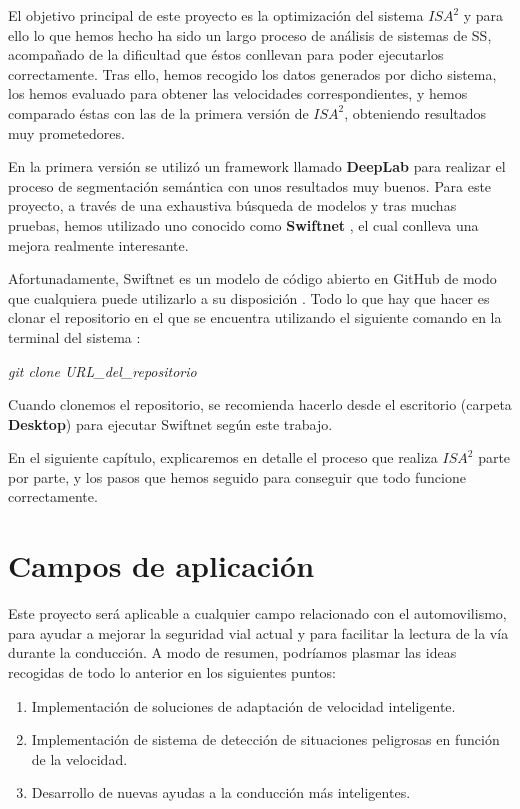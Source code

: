 El objetivo principal de este proyecto es la optimización del sistema $ISA^{2}$ y para ello lo que hemos hecho ha sido un largo proceso de análisis de sistemas de \ac{SS}, acompañado de la dificultad que éstos conllevan para poder ejecutarlos correctamente. Tras ello, hemos recogido los datos generados por dicho sistema, los hemos evaluado para obtener las velocidades correspondientes, y hemos comparado éstas con las de la primera versión de $ISA^{2}$, obteniendo resultados muy prometedores.


En la primera versión se utilizó un framework llamado \textbf{DeepLab} \cite{deeplab} para realizar el proceso de segmentación semántica con unos resultados muy buenos. Para este proyecto, a través de una exhaustiva búsqueda de modelos y tras muchas pruebas, hemos utilizado uno conocido como \textbf{Swiftnet} \cite{swiftnet}, el cual conlleva una mejora realmente interesante.

Afortunadamente, Swiftnet es un modelo de código abierto en GitHub de modo que cualquiera puede utilizarlo a su disposición \cite{github_swiftnet}. Todo lo que hay que hacer es clonar el repositorio en el que se encuentra utilizando el siguiente comando en la terminal del sistema \cite{clonar}:

\begin{center}
\textit{git clone URL\_del\_repositorio}
\end{center}

Cuando clonemos el repositorio, se recomienda hacerlo desde el escritorio (carpeta \textbf{Desktop}) para ejecutar Swiftnet según este trabajo.

En el siguiente capítulo, explicaremos en detalle el proceso que realiza $ISA^{2}$ parte por parte, y los pasos que hemos seguido para conseguir que todo funcione correctamente.

\section{Campos de aplicación}


Este proyecto será aplicable a cualquier campo relacionado con el automovilismo, para ayudar a mejorar la seguridad vial actual y para facilitar la lectura de la vía durante la conducción. A modo de resumen, podríamos plasmar las ideas recogidas de todo lo anterior en los siguientes puntos:
\begin{enumerate}	
	\item Implementación de soluciones de adaptación de velocidad inteligente.
	\item Implementación de sistema de detección de situaciones peligrosas en función de la velocidad.
	\item Desarrollo de nuevas ayudas a la conducción más inteligentes.
\end{enumerate}

